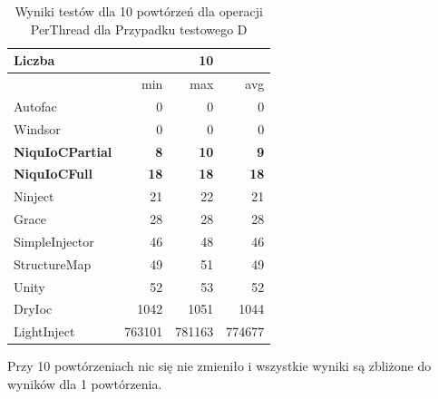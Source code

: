 \documentclass[12pt]{article}
\begin{document}
\begin{table}[H]
\captionsetup{belowskip=0pt,aboveskip=0pt}
\begin{center}
\begin{small}
	\begin{tabular}{ | l | r r r | }
    		\hline
Liczba & & 10 & \\ \hline
 & min & max & avg \\ \hline
Autofac & 0 & 0 & 0 \\ \hline
Windsor & 0 & 0 & 0 \\ \hline
\textbf{NiquIoCPartial} & \textbf{8} & \textbf{10} & \textbf{9} \\ \hline
\textbf{NiquIoCFull} & \textbf{18} & \textbf{18} & \textbf{18} \\ \hline
Ninject & 21 & 22 & 21 \\ \hline
Grace & 28 & 28 & 28 \\ \hline
SimpleInjector & 46 & 48 & 46 \\ \hline
StructureMap & 49 & 51 & 49 \\ \hline
Unity & 52 & 53 & 52 \\ \hline
DryIoc & 1042 & 1051 & 1044 \\ \hline
LightInject & 763101 & 781163 & 774677 \\ \hline
  	\end{tabular}
\end{small}
\end{center}
\caption{Wyniki testów dla 10 powtórzeń dla operacji PerThread dla Przypadku testowego D}
\label{TestCaseB_PerThread10}
\end{table}
Przy 10 powtórzeniach nic się nie zmieniło i wszystkie wyniki są zbliżone do wyników dla 1 powtórzenia.
\end{document}
